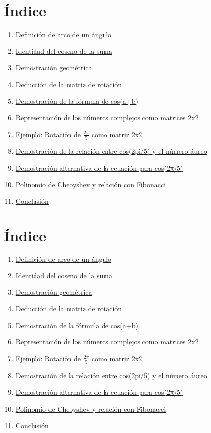 \documentclass{article}
\begin{document}
\section*{Índice}
\begin{enumerate}
  \item \hyperref[sec:arco]{Definición de arco de un ángulo}
  \item \hyperref[sec:identidad]{Identidad del coseno de la suma}
  \item \hyperref[sec:geom]{Demostración geométrica}
  \item \hyperref[sec:rotacion]{Deducción de la matriz de rotación}
  \item \hyperref[sec:demcos]{Demostración de la fórmula de cos(a+b)}
  \item \hyperref[sec:complejos]{Representación de los números complejos como matrices 2x2}
  \item \hyperref[sec:ejemplo]{Ejemplo: Rotación de $\frac{2\pi}{5}$ como matriz 2x2}
  \item \hyperref[sec:cosenoaureo]{Demostración de la relación entre cos(2pi/5) y el número áureo}
  \item \hyperref[sec:demostracion_alternativa]{Demostración alternativa de la ecuación para cos(2π/5)}
  \item \hyperref[sec:chebfib]{Polinomio de Chebyshev y relación con Fibonacci}
  \item \hyperref[sec:conclusion]{Conclusión}
\end{enumerate}

\section*{Índice}
\begin{enumerate}
  \item \hyperref[sec:arco]{Definición de arco de un ángulo}
  \item \hyperref[sec:identidad]{Identidad del coseno de la suma}
  \item \hyperref[sec:geom]{Demostración geométrica}
  \item \hyperref[sec:rotacion]{Deducción de la matriz de rotación}
  \item \hyperref[sec:demcos]{Demostración de la fórmula de cos(a+b)}
  \item \hyperref[sec:complejos]{Representación de los números complejos como matrices 2x2}
  \item \hyperref[sec:ejemplo]{Ejemplo: Rotación de $\frac{2\pi}{5}$ como matriz 2x2}
  \item \hyperref[sec:cosenoaureo]{Demostración de la relación entre cos(2pi/5) y el número áureo}
  \item \hyperref[sec:demostracion_alternativa]{Demostración alternativa de la ecuación para cos(2π/5)}
  \item \hyperref[sec:chebfib]{Polinomio de Chebyshev y relación con Fibonacci}
  \item \hyperref[sec:conclusion]{Conclusión}
\end{enumerate}
\end{document}
